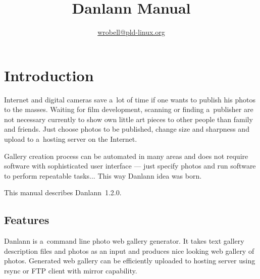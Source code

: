 \documentclass{article}
\title{Danlann Manual}
\author{\url{wrobell@pld-linux.org}}
\begin{document}
\maketitle

\tableofcontents
{}

\section{Introduction}
Internet and digital cameras save a~lot of time
if one wants to publish his photos to the masses. Waiting for film
development, scanning or finding a~publisher are not necessary currently to show
own little art pieces to other people than family and friends. Just choose
photos to be published, change size and sharpness and
upload to a~hosting server on the Internet.

Gallery creation process can be automated in many areas and does not require
software with sophisticated user interface --- just specify photos and run
software to perform repeatable tasks... This way Danlann idea was born.

This manual describes Danlann~1.2.0.

\subsection{Features}
Danlann is a~command line photo web gallery generator.
It takes text gallery description files and photos as an input and produces 
nice looking web gallery of photos. Generated web gallery can be
efficiently uploaded to hosting server using rsync or FTP client with
mirror capability.
\end{document}
